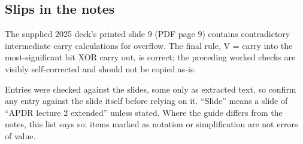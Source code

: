 \documentclass[11pt]{article}
\begin{document}
\begin{keepsection}
\section{Slips in the notes}

The supplied 2025 deck’s printed slide 9 (PDF page 9) contains contradictory intermediate carry calculations for overflow. The final rule, V = carry into the most-significant bit XOR carry out, is correct; the preceding worked checks are visibly self-corrected and should not be copied as-is.

Entries were checked against the slides, some only as extracted text, so confirm any entry against the slide itself before relying on it. “Slide” means a slide of “APDR lecture 2 extended” unless stated. Where the guide differs from the notes, this list says so; items marked as notation or simplification are not errors of value.


\end{keepsection}
\end{document}
